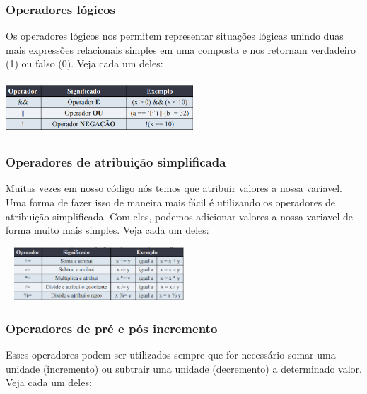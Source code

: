 \documentclass{report}
\begin{document}
	
	\subsubsection{Operadores lógicos}
	
	Os operadores lógicos nos permitem representar situações lógicas unindo duas mais expressões relacionais simples em uma composta e nos retornam verdadeiro (1) ou falso (0). Veja cada um deles:
	
	\begin{center}
		
		\includegraphics[width=7cm,height=2cm,keepaspectratio=false]{imagens/logicos.png}
		
	\end{center}
	
	\subsubsection{Operadores de atribuição simplificada}
	Muitas vezes em nosso código nós temos que atribuir valores a nossa variavel. Uma forma de fazer isso de maneira mais fácil é utilizando os operadores de atribuição simplificada. Com eles, podemos adicionar valores a nossa variavel de forma muito mais simples. Veja cada um deles:
	
	\begin{center}
		
		\includegraphics[width=7cm,height=2cm,keepaspectratio=false]{imagens/operadoresatribuicaosimp.png}
		
	\end{center}
	
	
	\subsubsection{Operadores de pré e pós incremento}
	Esses operadores podem ser utilizados sempre que for necessário somar uma unidade (incremento) ou subtrair uma unidade (decremento) a determinado valor. Veja cada um deles:
	
\end{document}
